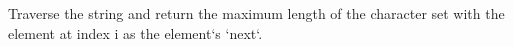 \documentclass[preview]{standalone}
\begin{document}
Traverse the string and return the maximum length of the character set with the element at index i as the element`s `next`.\\
\end{document}
